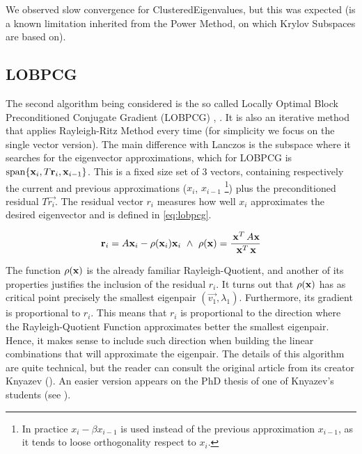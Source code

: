 We observed slow convergence for \gls{ClusteredEigenvalues}, but this
was expected (is a known limitation inherited from the Power
Method, on which Krylov Subspaces are based on).


\subsection{\gls{LOBPCG}}
\label{sub:lobpcg}

The second algorithm being considered is the so called Locally Optimal
Block Preconditioned Conjugate Gradient (\gls{LOBPCG})
\cite{knyazev01}, \cite{lashuk07}. It is also an
iterative method that applies Rayleigh-Ritz Method every time (for
simplicity we focus on the single vector version). The main difference
with Lanczos is the subspace where it searches for the eigenvector
approximations, which for \gls{LOBPCG} is $\operatorname{span} \{\mathbf{x}_i,
T\mathbf{r}_i, \mathbf{x}_{i-1}\}$. This is a fixed size set of 3 vectors,
containing respectively the current and previous approximations
($x_i$, $x_{i-1}$ \footnote{In practice $x_{i} - \beta x_{i-1}$ is used
  instead of the previous approximation $x_{i-1}$, as it tends to
  loose orthogonality respect to $x_i$.}) plus the preconditioned
residual $T\vec{r_i}$. The residual vector $r_i$ measures how well
$x_i$ approximates the desired eigenvector and is defined in
\cref{eq:lobpcg}. 

\begin{equation}
\label{eq:lobpcg}  
    \joinabove{0}
    \vec{r}_i = A\vec{x}_i - \func{\rho}(\vec{x}_i)\vec{x}_i
    \ds{\land}
    \func{\rho}(\vec{x}) = \dfrac{\trans{\vec{x}}A\vec{x}}{\trans{\vec{x}}\vec{x}}
\end{equation}
\joinbelow{1cm}

The function $\operatorname{\rho}(\mathbf{x})$ is the already familiar 
Rayleigh-Quotient, and another of its properties justifies the
inclusion of the residual $r_i$. It turns out that
$\operatorname{\rho}(\mathbf{x})$ has as critical point precisely the smallest
eigenpair $(\vec{v_1},\lambda_1)$. Furthermore, its gradient is
proportional to $r_i$. This means that $r_i$ is proportional to the
direction where the Rayleigh-Quotient Function approximates better
the smallest eigenpair. Hence, it makes sense to include such
direction when building the linear combinations that will approximate
the eigenpair. The details of this algorithm are quite
technical, but the reader can consult the original article from
its creator Knyazev (\cite{knyazev01}). An easier version
appears on the PhD thesis of one of Knyazev's students (see
\cite{lashuk07}).  \\ 

